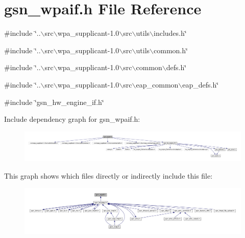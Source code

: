\hypertarget{a00615}{
\section{gsn\_\-wpaif.h File Reference}
\label{a00615}
}
{\ttfamily \#include \char`\"{}..$\backslash$src$\backslash$wpa\_\-supplicant-\/1.0$\backslash$src$\backslash$utils$\backslash$includes.h\char`\"{}}\par
{\ttfamily \#include \char`\"{}..$\backslash$src$\backslash$wpa\_\-supplicant-\/1.0$\backslash$src$\backslash$utils$\backslash$common.h\char`\"{}}\par
{\ttfamily \#include \char`\"{}..$\backslash$src$\backslash$wpa\_\-supplicant-\/1.0$\backslash$src$\backslash$common$\backslash$defs.h\char`\"{}}\par
{\ttfamily \#include \char`\"{}..$\backslash$src$\backslash$wpa\_\-supplicant-\/1.0$\backslash$src$\backslash$eap\_\-common$\backslash$eap\_\-defs.h\char`\"{}}\par
{\ttfamily \#include \char`\"{}gsn\_\-hw\_\-engine\_\-if.h\char`\"{}}\par
Include dependency graph for gsn\_\-wpaif.h:
\nopagebreak
\begin{figure}[H]
\begin{center}
\leavevmode
\includegraphics[width=400pt]{a00863}
\end{center}
\end{figure}
This graph shows which files directly or indirectly include this file:
\nopagebreak
\begin{figure}[H]
\begin{center}
\leavevmode
\includegraphics[width=400pt]{a00864}
\end{center}
\end{figure}

